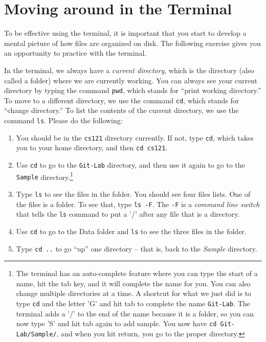 \documentclass[11pt]{article}
\begin{document}
\section*{Moving around in the Terminal}

To be effective using the terminal, it is important that you start to develop a mental picture of how files are organized on disk.  The following exercise gives you an opportunity to practice with the terminal.

In the terminal, we always have a {\em current directory}, which is the directory (also called a folder) where we are currently working.  You can always see your current directory by typing the command {\tt pwd}, which stands for ``print working directory.''  To move to a different directory, we use the command {\tt cd}, which stands for ``change directory.''  To list the contents of the current directory, we use the command {\tt ls}.  Please do the following:

\begin{enumerate}
\item You should be in the {\tt cs121} directory currently.  If not, type {\tt cd}, which takes you to your home directory, and then {\tt cd cs121}.

\item Use {\tt cd} to go to the {\tt Git-Lab} directory, and then use it again to go to the {\tt Sample} directory.\footnote{The terminal has an auto-complete feature where you can type the start of a name, hit the tab key, and it will complete the name for you.  You can also change multiple directories at a time.  A shortcut for what we just did is to type {\tt cd} and the letter 'G' and hit tab to complete the name {\tt Git-Lab}. The terminal adds a '/' to the end of the name because it is a folder, so you can now type 'S' and hit tab again to add sample.  You now have {\tt cd Git-Lab/Sample/}, and when you hit return, you go to the proper directory.}

\item Type {\tt ls} to see the files in the folder.  You should see four files lists.  One of the files is a folder.  To see that, type {\tt ls -F}.  The {\tt -F} is a {\em command line switch} that tells the {\tt ls} command to put a '/' after any file that is a directory.

\item Use {\tt cd} to go to the Data folder and {\tt ls} to see the three files in the folder.

\item Type {\tt cd ..} to go ``up'' one directory -- that is, back to the {\em Sample} directory.

\end{enumerate}
\end{document}
